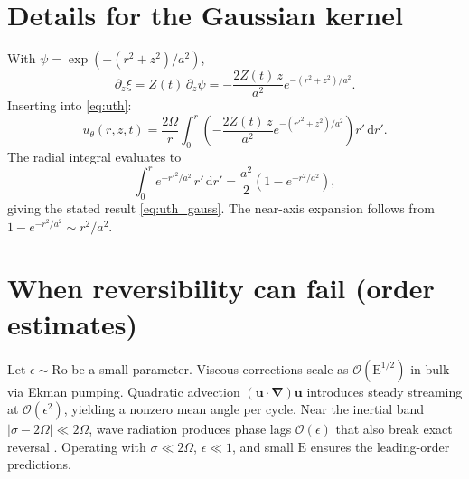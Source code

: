 \documentclass[12pt]{article}
\newcommand{\dd}{\mathrm{d}}
\newcommand{\bU}{\boldsymbol{u}}
\newcommand{\grad}{\boldsymbol{\nabla}}
\newcommand{\p}{\partial}
\begin{document}
    
    




    \clearpage
    \appendix
    \section{Details for the Gaussian kernel}
    With \(\psi=\exp(-(r^2+z^2)/a^2)\),
    \[
        \p_z\xi = Z(t)\,\p_z\psi = -\frac{2Z(t)\,z}{a^2} e^{-(r^2+z^2)/a^2}.
    \]
    Inserting into \eqref{eq:uth}:
    \[
        u_\theta(r,z,t)=\frac{2\Omega}{r}\int_0^r \left(-\frac{2Z(t)\,z}{a^2}e^{-(r'^2+z^2)/a^2}\right) r'\,\dd r'.
    \]
    The radial integral evaluates to
    \[
        \int_0^r e^{-r'^2/a^2}\,r'\,\dd r'=\frac{a^2}{2}\left(1-e^{-r^2/a^2}\right),
    \]
    giving the stated result \eqref{eq:uth_gauss}. The near-axis expansion follows from \(1-e^{-r^2/a^2}\sim r^2/a^2\).

    \section{When reversibility can fail (order estimates)}
    Let \(\epsilon\sim \mathrm{Ro}\) be a small parameter. Viscous corrections scale as \(\mathcal{O}(\mathrm{E}^{1/2})\) in bulk via Ekman pumping. Quadratic advection \((\bU\!\cdot\!\grad)\bU\) introduces steady streaming at \(\mathcal{O}(\epsilon^2)\), yielding a nonzero mean angle per cycle. Near the inertial band \(|\sigma-2\Omega|\ll 2\Omega\), wave radiation produces phase lags \(\mathcal{O}(\epsilon)\) that also break exact reversal \cite{Greenspan1968}. Operating with \(\sigma\ll 2\Omega\), \(\epsilon\ll1\), and small \(\mathrm{E}\) ensures the leading-order predictions.
\end{document}
